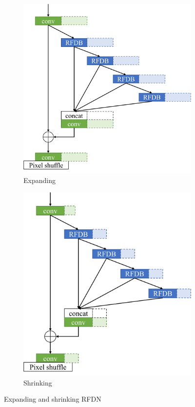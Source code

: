 \documentclass[10pt,twocolumn,letterpaper]{article}
\begin{document}
\begin{figure}
\begin{subfigure}[b]{0.49\linewidth}
        \includegraphics[width=\textwidth]{../expand.pdf}
        \caption{Expanding}
        \label{fig:Expanding}
    \end{subfigure}
    \begin{subfigure}[b]{0.49\linewidth}
		\centering
        \includegraphics[width=\textwidth]{../shrink.pdf}
        \caption{Shrinking}
        \label{fig:Shrinking}
    \end{subfigure}
    \caption{Expanding and shrinking RFDN}
    \label{fig:PRFDN}
\end{figure}
\end{document}
